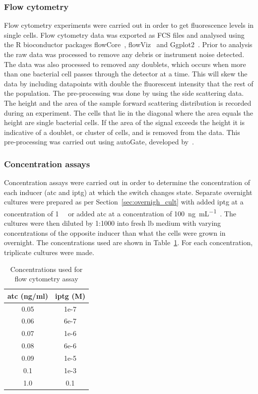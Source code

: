 \subsubsection{Flow cytometry}
Flow cytometry experiments were carried out in order to get fluorescence levels in single cells. Flow cytometry data was exported as FCS files and analysed using the R bioconductor packages flowCore~\autocite{flowCore:man}, flowViz~\autocite{flowViz:man} and Ggplot2~\autocite{ggplot2:bk}. Prior to analysis the raw data was processed to remove any debris or instrument noise detected. The data was also processed to removed any doublets, which occurs when more than one bacterial  cell passes through the detector at a time. This will skew the data by including datapoints  with double the fluorescent intensity that the rest of the population. The pre-processing was done by using the side scattering data. The height and the area of the sample forward scattering distribution is recorded during an experiment. The cells that lie in the diagonal where the area equals the height are single bacterial cells. If the area of the signal exceeds the height it is indicative of a doublet, or cluster of cells, and is removed from the data. This pre-processing was carried out using autoGate, developed by~\textcite{Fedorec2016}. 



\subsubsection{Concentration assays}
\label{sec:flo_conc}
Concentration assays were carried out in order to determine the concentration of each inducer (\acrshort{atc} and \acrshort{iptg}) at which the switch changes state.  Separate overnight cultures were prepared as per Section~\ref{sec:overnigh_cult} with added \acrshort{iptg} at a concentration of \SI{1}{\milli\molar} or added \acrshort{atc} at a concentration of \SI{100}{\nano\gram\per\milli\liter}~\autocite{Litcofsky:2012gr}. The cultures were then diluted by 1:1000 into fresh \acrshort{lb} medium with varying concentrations of the opposite inducer than what the cells were grown in overnight. The concentrations used are shown in Table~\ref{tab:flow_conc}. For each concentration, triplicate cultures were made.


\begin{table}[tb]
\centering
\caption{Concentrations used for flow cytometry assay}
\label{tab:flow_conc}
\begin{tabular}{@{}cc@{}}
\toprule
\acrshort{atc} (ng/ml)  & \acrshort{iptg} (M) \\ \midrule
0.05 & 1e-7 \\
0.06 & 6e-7 \\
0.07 & 1e-6 \\
0.08 & 6e-6 \\
0.09 & 1e-5 \\
0.1  & 1e-3 \\
1.0  & 0.1  \\ \bottomrule
\end{tabular}
\end{table}

